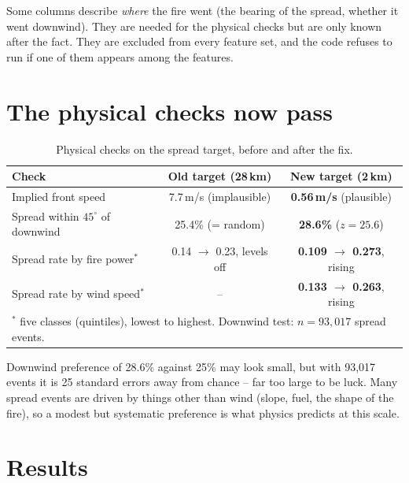 \documentclass[11pt,a4paper,oneside]{report}
\begin{document}
\begin{warnbox}
Some columns describe \emph{where} the fire went (the bearing of the spread, whether
it went downwind). They are needed for the physical checks but are only known
after the fact. They are excluded from every feature set, and the code refuses to
run if one of them appears among the features.
\end{warnbox}

\section{The physical checks now pass}

\begin{table}[H]
\centering\small
\caption{Physical checks on the spread target, before and after the fix.}
\label{tab:checks}
\begin{tabular}{lcc}
\toprule
Check & Old target (28\,km) & New target (2\,km) \\
\midrule
Implied front speed & 7.7\,m/s (implausible) & \textbf{0.56\,m/s} (plausible) \\
Spread within $45^\circ$ of downwind & 25.4\% (= random) & \textbf{28.6\%} ($z=25.6$) \\
Spread rate by fire power$^\ast$ & 0.14 $\rightarrow$ 0.23, levels off & \textbf{0.109 $\rightarrow$ 0.273}, rising \\
Spread rate by wind speed$^\ast$ & -- & \textbf{0.133 $\rightarrow$ 0.263}, rising \\
\bottomrule
\multicolumn{3}{l}{\footnotesize $^\ast$ five classes (quintiles), lowest to highest. Downwind test: $n=93{,}017$ spread events.}\\
\end{tabular}
\end{table}

\begin{plainbox}
Downwind preference of 28.6\% against 25\% may look small, but with 93{,}017
events it is 25 standard errors away from chance -- far too large to be luck.
Many spread events are driven by things other than wind (slope, fuel, the shape
of the fire), so a modest but systematic preference is what physics predicts at
this scale.
\end{plainbox}

\section{Results}
\end{document}
